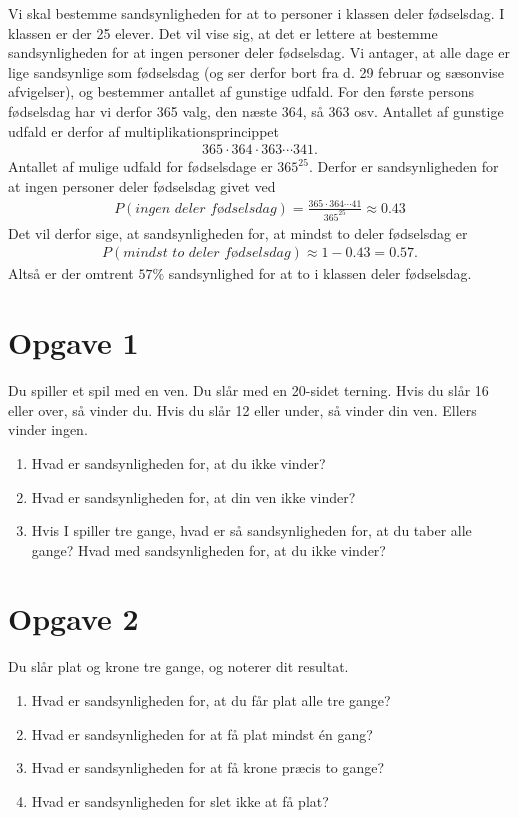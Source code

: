 \begin{exa}

Vi skal bestemme sandsynligheden for at to personer i klassen deler fødselsdag. I klassen er der 25 elever. Det vil vise sig, at det er lettere at bestemme sandsynligheden for at ingen personer deler fødselsdag. Vi antager, at alle dage er lige sandsynlige som fødselsdag (og ser derfor bort fra d. 29 februar og sæsonvise afvigelser), og bestemmer antallet af gunstige udfald. For den første persons fødselsdag har vi derfor 365 valg, den næste 364, så 363 osv. Antallet af gunstige udfald er derfor af multiplikationsprincippet
\begin{align*}
365\cdot 364\cdot 363 \cdots 341.
\end{align*}
Antallet af mulige udfald for fødselsdage er $365^{25}$. Derfor er sandsynligheden for at ingen personer deler fødselsdag givet ved
\begin{align*}
P(\textit{ingen deler fødselsdag}) = \frac{365\cdot 364 \cdots 41}{365^{25}} \approx 0.43
\end{align*}
Det vil derfor sige, at sandsynligheden for, at mindst to deler fødselsdag er 
\begin{align*}
P(\textit{mindst to deler fødselsdag}) \approx 1-0.43 = 0.57.
\end{align*}
Altså er der omtrent $57\%$ sandsynlighed for at to i klassen deler fødselsdag. 
\end{exa}

\section*{Opgave 1}
Du spiller et spil med en ven. Du slår med en 20-sidet terning. Hvis du slår 16 eller over, så vinder du. Hvis du slår 12 eller under, så vinder din ven. Ellers vinder ingen.
\begin{enumerate}[label=\roman*)]
	\item Hvad er sandsynligheden for, at du ikke vinder?
	\item Hvad er sandsynligheden for, at din ven ikke vinder?
	\item Hvis I spiller tre gange, hvad er så sandsynligheden for, at du taber alle gange? Hvad med sandsynligheden for, at du ikke vinder?
\end{enumerate}

\section*{Opgave 2}
Du slår plat og krone tre gange, og noterer dit resultat.
\begin{enumerate}[label=\roman*)]
	\item Hvad er sandsynligheden for, at du får plat alle tre gange?
	\item Hvad er sandsynligheden for at få plat mindst én gang?
	\item Hvad er sandsynligheden for at få krone præcis to gange?
	\item Hvad er sandsynligheden for slet ikke at få plat?
\end{enumerate}

